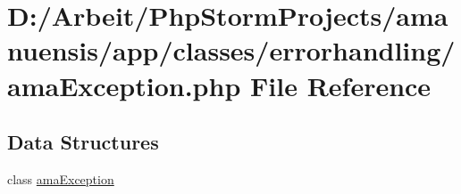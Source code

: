 \hypertarget{ama_exception_8php}{}\section{D\+:/\+Arbeit/\+Php\+Storm\+Projects/amanuensis/app/classes/errorhandling/ama\+Exception.php File Reference}
\label{ama_exception_8php}
\subsection*{Data Structures}
\begin{DoxyCompactItemize}
\item 
class \hyperlink{classama_exception}{ama\+Exception}
\end{DoxyCompactItemize}
